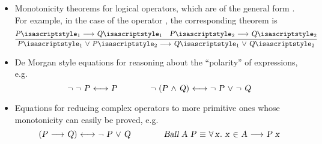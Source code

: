 \begin{isabellebody}
\begin{isamarkuptext}
\begin{itemize}
  \item Monotonicity theorems for logical operators, which are of the
  general form \isa{{\isachardoublequote}{\isacharparenleft}{\isasymdots}\ {\isasymlongrightarrow}\ {\isasymdots}{\isacharparenright}\ {\isasymLongrightarrow}\ {\isasymdots}\ {\isacharparenleft}{\isasymdots}\ {\isasymlongrightarrow}\ {\isasymdots}{\isacharparenright}\ {\isasymLongrightarrow}\ {\isasymdots}\ {\isasymlongrightarrow}\ {\isasymdots}{\isachardoublequote}}.  For example, in
  the case of the operator \isa{{\isachardoublequote}{\isasymor}{\isachardoublequote}}, the corresponding theorem is
  \[
  \infer{\isa{{\isachardoublequote}P\isactrlsub {\isadigit{1}}\ {\isasymor}\ P\isactrlsub {\isadigit{2}}\ {\isasymlongrightarrow}\ Q\isactrlsub {\isadigit{1}}\ {\isasymor}\ Q\isactrlsub {\isadigit{2}}{\isachardoublequote}}}{\isa{{\isachardoublequote}P\isactrlsub {\isadigit{1}}\ {\isasymlongrightarrow}\ Q\isactrlsub {\isadigit{1}}{\isachardoublequote}} & \isa{{\isachardoublequote}P\isactrlsub {\isadigit{2}}\ {\isasymlongrightarrow}\ Q\isactrlsub {\isadigit{2}}{\isachardoublequote}}}
  \]

  \item De Morgan style equations for reasoning about the ``polarity''
  of expressions, e.g.
  \[
  \isa{{\isachardoublequote}{\isasymnot}\ {\isasymnot}\ P\ {\isasymlongleftrightarrow}\ P{\isachardoublequote}} \qquad\qquad
  \isa{{\isachardoublequote}{\isasymnot}\ {\isacharparenleft}P\ {\isasymand}\ Q{\isacharparenright}\ {\isasymlongleftrightarrow}\ {\isasymnot}\ P\ {\isasymor}\ {\isasymnot}\ Q{\isachardoublequote}}
  \]

  \item Equations for reducing complex operators to more primitive
  ones whose monotonicity can easily be proved, e.g.
  \[
  \isa{{\isachardoublequote}{\isacharparenleft}P\ {\isasymlongrightarrow}\ Q{\isacharparenright}\ {\isasymlongleftrightarrow}\ {\isasymnot}\ P\ {\isasymor}\ Q{\isachardoublequote}} \qquad\qquad
  \isa{{\isachardoublequote}Ball\ A\ P\ {\isasymequiv}\ {\isasymforall}x{\isachardot}\ x\ {\isasymin}\ A\ {\isasymlongrightarrow}\ P\ x{\isachardoublequote}}
  \]

  \end{itemize}


\end{isamarkuptext}
\end{isabellebody}
